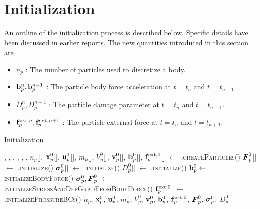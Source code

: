 \section{Initialization}
An outline of the initialization process is described below.  Specific details have been 
discussed in earlier reports. The new quantities introduced in this section are
\begin{itemize} 
  \setlength\itemsep{1pt}
  \item $n_p$ : {\Ochre The number of particles used to discretize a body.}
  \item $\mathbf{b}_p^n, \mathbf{b}_p^{n+1}$ : {\Ochre The particle body force acceleration at $t = t_n$ and $t = t_{n+1}$.}
  \item $D_p^n, D_p^{n+1}$ : {\Ochre The particle damage parameter at $t = t_n$ and $t = t_{n+1}$.}
  \item $\mathbf{f}_p^{\text{ext},n}, \mathbf{f}_p^{\text{ext},n+1}$ : {\Ochre The particle external force at $t = t_n$ and $t = t_{n+1}$.}
\end{itemize}
\begin{breakablealgorithm}
  \caption{Initialization}
  \begin{algorithmic}[1]
    \Require {}, , , 
             , ,\WRP 
              , 
        \State $n_p$[\TTmatl], $\mathbf{x}^0_p$[\TTmatl], $\mathbf{u}^0_p$[\TTmatl], $m_p$[\TTmatl], 
             $V^0_p$[\TTmatl], $\mathbf{v}^0_p$[\TTmatl], $\mathbf{b}^0_p$[\TTmatl], \WRP
             $\mathbf{f}^{\text{ext},0}_p$[\TTmatl] $\leftarrow$ \TTmatl.\textsc{createParticles}()
        \State $\boldsymbol{F}^0_p$[\TTmatl] $\leftarrow$ .\textsc{initialize}(\TTmatl)
        \State $\boldsymbol{\sigma}^0_p$[\TTmatl] $\leftarrow$ .\textsc{initialize}(\TTmatl)
        \State $D^0_p$[\TTmatl] $\leftarrow$ .\textsc{initialize}(\TTmatl)
      \EndFor
        \State $\mathbf{b}^0_p \leftarrow$ \textsc{initializeBodyForce}()
        \State $\boldsymbol{\sigma}^0_p, \boldsymbol{F}^0_p$ $\leftarrow$ \textsc{initializeStressAndDefGradFromBodyForce}()
      \EndIf
        \State $\mathbf{f}^{\text{ext},0}_p$ $\leftarrow$ .\textsc{initializePressureBCs}()
      \EndIf
      \State \Return $n_p$, $\mathbf{x}^0_p$, $\mathbf{u}^0_p$, $m_p$, 
             $V^0_p$, $\mathbf{v}^0_p$, $\mathbf{b}^0_p$, $\mathbf{f}^{\text{ext},0}_p$, $\boldsymbol{F}^0_p$, $\boldsymbol{\sigma}^0_p$, $D^0_p$
    \EndProcedure
  \end{algorithmic}
\end{breakablealgorithm}

